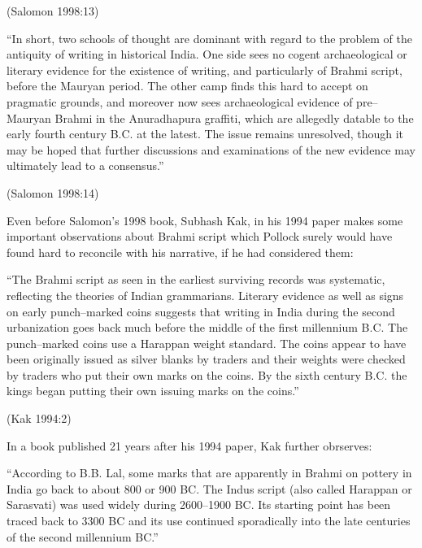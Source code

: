 \hfill (Salomon 1998:13)

\begin{myquote}
“In short, two schools of thought are dominant with regard to the problem of the antiquity of writing in historical India. One side sees no cogent archaeological or literary evidence for the existence of writing, and particularly of Brahmi script, before the Mauryan period. The other camp finds this hard to accept on pragmatic grounds, and moreover now sees archaeological evidence of pre–Mauryan Brahmi in the Anuradhapura graffiti, which are allegedly datable to the early fourth century B.C. at the latest. The issue remains unresolved, though it may be hoped that further discussions and examinations of the new evidence may ultimately lead to a consensus.”
\end{myquote}

\hfill (Salomon 1998:14)

Even before Salomon’s 1998 book, Subhash Kak, in his 1994 paper makes some important observations about Brahmi script which Pollock surely would have found hard to reconcile with his narrative, if he had considered them:

\begin{myquote}
“The Brahmi script as seen in the earliest surviving records was systematic, reflecting the theories of Indian grammarians. Literary evidence as well as signs on early punch–marked coins suggests that writing in India during the second urbanization goes back much before the middle of the first millennium B.C. The punch–marked coins use a Harappan weight standard. The coins appear to have been originally issued as silver blanks by traders and their weights were checked by traders who put their own marks on the coins. By the sixth century B.C. the kings began putting their own issuing marks on the coins.”
\end{myquote}

\hfill (Kak 1994:2)

In a book published 21 years after his 1994 paper, Kak further obrserves:

\begin{myquote}
“According to B.B. Lal, some marks that are apparently in Brahmi on pottery in India go back to about 800 or 900 BC. The Indus script (also called Harappan or Sarasvati) was used widely during 2600–1900 BC. Its starting point has been traced back to 3300 BC and its use continued sporadically into the late centuries of the second millennium BC.”
\end{myquote}

